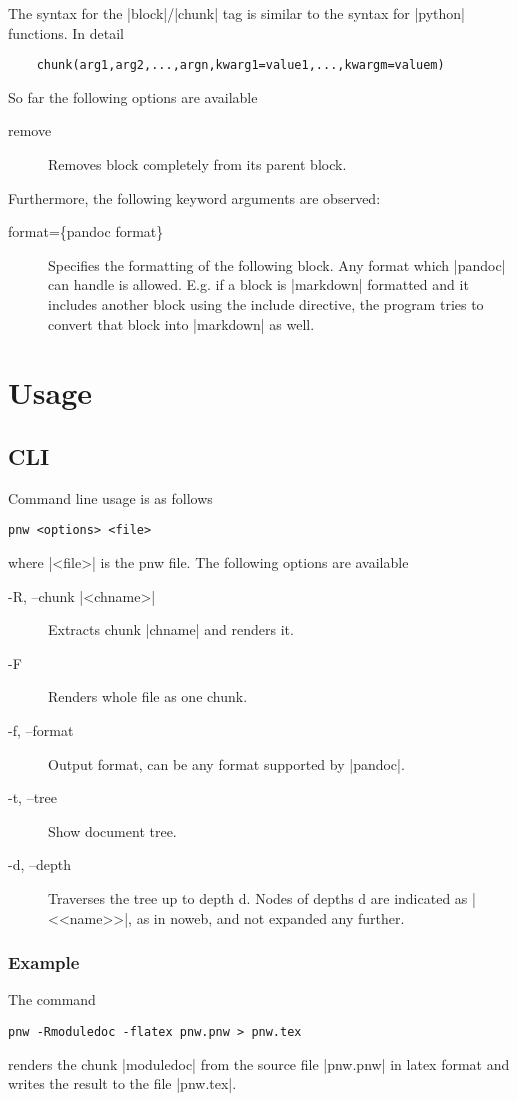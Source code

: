 \documentclass[neutral,proc,reqno]{ml-gen}
\begin{document}
The syntax for the |block|/|chunk| tag is similar to the syntax for |python|
functions. In detail
\begin{lstlisting}
    chunk(arg1,arg2,...,argn,kwarg1=value1,...,kwargm=valuem)
\end{lstlisting}
So far the following options are available
\begin{description}
    \item[remove] Removes block completely from its parent block.
\end{description}        
Furthermore, the following keyword arguments are observed:
\begin{description}
    \item[format=\{pandoc format\}] Specifies the formatting of the following
        block. Any format which |pandoc| can handle is allowed. E.g. if a
        block is |markdown| formatted and it includes another block using the
        include directive, the program tries to convert that block into
        |markdown| as well.
\end{description}        


\section{Usage}
\subsection{CLI}
Command line usage is as follows
\begin{lstlisting}
pnw <options> <file>
\end{lstlisting}
where |<file>| is the pnw file. The following options are available
\begin{description}
    \item[-R, --chunk |<chname>|] Extracts chunk |chname| and renders it.
    \item[-F] Renders whole file as one chunk.
    \item[-f, --format] Output format, can be any format supported by
        |pandoc|.     
    \item[-t, --tree] Show document tree.
    \item[-d, --depth] Traverses the tree up to depth d. Nodes of depths
        d are indicated as |<<name>>|, as in noweb, and not expanded any further.
\end{description}        

\subsubsection{Example}
The command
\begin{lstlisting}
pnw -Rmoduledoc -flatex pnw.pnw > pnw.tex
\end{lstlisting}
renders the chunk |moduledoc| from the source file |pnw.pnw| in latex
format and writes the result to the file |pnw.tex|.
\end{document}
